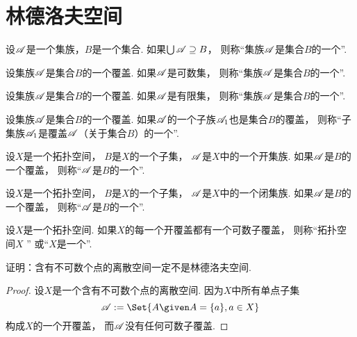 \section{林德洛夫空间}
\begin{definition}
设\(\mathscr{A}\)是一个集族，\(B\)是一个集合.
如果\(\bigcup \mathscr{A} \supseteq B\)，
则称“集族\(\mathscr{A}\)是集合\(B\)的一个”.
\end{definition}
\begin{definition}
设集族\(\mathscr{A}\)是集合\(B\)的一个覆盖.
如果\(\mathscr{A}\)是可数集，
则称“集族\(\mathscr{A}\)是集合\(B\)的一个”.
\end{definition}
\begin{definition}
设集族\(\mathscr{A}\)是集合\(B\)的一个覆盖.
如果\(\mathscr{A}\)是有限集，
则称“集族\(\mathscr{A}\)是集合\(B\)的一个”.
\end{definition}
\begin{definition}
设集族\(\mathscr{A}\)是集合\(B\)的一个覆盖.
如果\(\mathscr{A}\)的一个子族\(\mathscr{A}_1\)也是集合\(B\)的覆盖，
则称“子集族\(\mathscr{A}_1\)是覆盖\(\mathscr{A}\)（关于集合\(B\)）的一个”.
\end{definition}
\begin{definition}
设\(X\)是一个拓扑空间，
\(B\)是\(X\)的一个子集，
\(\mathscr{A}\)是\(X\)中的一个开集族.
如果\(\mathscr{A}\)是\(B\)的一个覆盖，
则称“\(\mathscr{A}\)是\(B\)的一个”.
\end{definition}
\begin{definition}
设\(X\)是一个拓扑空间，
\(B\)是\(X\)的一个子集，
\(\mathscr{A}\)是\(X\)中的一个闭集族.
如果\(\mathscr{A}\)是\(B\)的一个覆盖，
则称“\(\mathscr{A}\)是\(B\)的一个”.
\end{definition}

\begin{definition}
设\(X\)是一个拓扑空间.
如果\(X\)的每一个开覆盖都有一个可数子覆盖，
则称“拓扑空间\(X\) ”
或“\(X\)是一个”.
\end{definition}

\begin{example}
证明：含有不可数个点的离散空间一定不是林德洛夫空间.
\begin{proof}
设\(X\)是一个含有不可数个点的离散空间.
因为\(X\)中所有单点子集\begin{equation*}
	\sfA \defeq \Set{
		A
		\given
		A = \{a\},
		a \in X
	}
\end{equation*}
构成\(X\)的一个开覆盖，
而\(\mathscr{A}\)没有任何可数子覆盖.
\end{proof}
\end{example}

